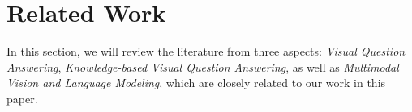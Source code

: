 \section{Related Work}
In this section, we will review the literature from three aspects: \textit{Visual Question Answering}, \textit{Knowledge-based Visual Question Answering}, as well as \textit{Multimodal Vision and Language Modeling}, which are closely related to our
work in this paper.
